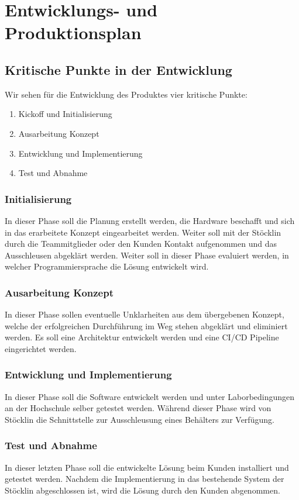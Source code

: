 \chapter{Entwicklungs- und Produktionsplan}

\section{Kritische Punkte in der Entwicklung}
Wir sehen für die Entwicklung des Produktes vier kritische Punkte:
\begin{enumerate}
	\item Kickoff und Initialisierung
	\item Ausarbeitung Konzept
	\item Entwicklung und Implementierung
	\item Test und Abnahme
\end{enumerate}

\subsection{Initialisierung}
In dieser Phase soll die Planung erstellt werden, die Hardware beschafft und sich in das erarbeitete Konzept eingearbeitet werden. Weiter soll mit der Stöcklin durch die Teammitglieder oder den Kunden Kontakt aufgenommen und das Ausschleusen abgeklärt werden. Weiter soll in dieser Phase evaluiert werden, in welcher Programmiersprache die Lösung entwickelt wird.

\subsection{Ausarbeitung Konzept}
In dieser Phase sollen eventuelle Unklarheiten aus dem übergebenen Konzept, welche der erfolgreichen Durchführung im Weg stehen abgeklärt und eliminiert werden. Es soll eine Architektur entwickelt werden und eine CI/CD Pipeline eingerichtet werden.

\subsection{Entwicklung und Implementierung}
In dieser Phase soll die Software entwickelt werden und unter Laborbedingungen an der Hochschule selber getestet werden. Während dieser Phase wird von Stöcklin die Schnittstelle zur Ausschleusung eines Behälters zur Verfügung. 

\subsection{Test und Abnahme}
In dieser letzten Phase soll die entwickelte Lösung beim Kunden installiert und getestet werden. Nachdem die Implementierung in das bestehende System der Stöcklin abgeschlossen ist, wird die Lösung durch den Kunden abgenommen.

